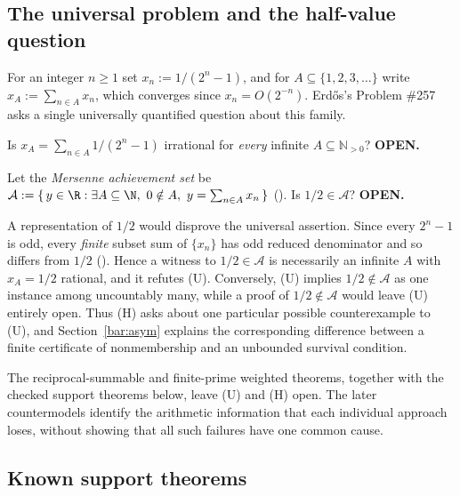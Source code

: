 \subsection{The universal problem and the half-value question}

For an integer $n \ge 1$ set $x_n := 1/(2^n-1)$, and for $A \subseteq \{1,2,3,\dots\}$ write
$x_A := \sum_{n \in A} x_n$, which converges since $x_n = O(2^{-n})$. Erd\H{o}s's
Problem \#257 asks a single universally quantified question about this family.

\begin{defn}
\label{defn:U}
Is $x_A = \sum_{n \in A} 1/(2^n-1)$ irrational for \emph{every} infinite $A \subseteq \mathbb N_{>0}$?
\textbf{OPEN.}
\end{defn}

\begin{defn}
\label{defn:H}
Let the \emph{Mersenne achievement set} be
$\mathcal{A} := \{\, y \in \R : \exists A \subseteq \N,\ 0 \notin A,\ y = \sum_{n \in A} x_n \,\}$
(). Is $1/2 \in \mathcal{A}$?
\textbf{OPEN.}
\end{defn}

A representation of $1/2$ would disprove the universal assertion. Since every $2^n-1$ is odd,
every \emph{finite} subset sum of $\{x_n\}$ has odd reduced denominator and so differs from $1/2$
(). Hence a
witness to $1/2 \in \mathcal{A}$ is necessarily an infinite $A$ with $x_A = 1/2$ rational, and it
refutes (U). Conversely, (U) implies $1/2 \notin \mathcal{A}$ as one instance among
uncountably many, while a proof of $1/2 \notin \mathcal{A}$ would leave (U) entirely open.
Thus (H) asks about one particular possible counterexample to (U), and
Section~\ref{bar:asym} explains the corresponding difference between a
finite certificate of nonmembership and an unbounded survival condition.

The reciprocal-summable and finite-prime weighted theorems, together with the
checked support theorems below, leave (U) and (H) open. The later countermodels
identify the arithmetic information that each individual approach loses,
without showing that all such failures have one common cause.

\subsection{Known support theorems}

